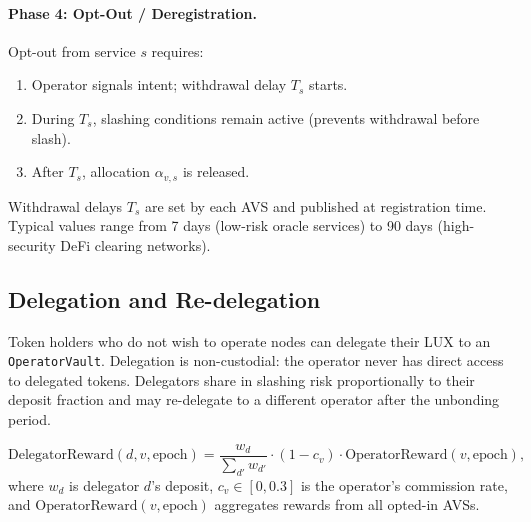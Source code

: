 \paragraph{Phase 4: Opt-Out / Deregistration.}
Opt-out from service $s$ requires:
\begin{enumerate}[leftmargin=1.5em]
  \item Operator signals intent; withdrawal delay $T_s$ starts.
  \item During $T_s$, slashing conditions remain active (prevents withdrawal before slash).
  \item After $T_s$, allocation $\alpha_{v,s}$ is released.
\end{enumerate}

Withdrawal delays $T_s$ are set by each AVS and published at registration time. Typical
values range from 7 days (low-risk oracle services) to 90 days (high-security DeFi
clearing networks).

\subsection{Delegation and Re-delegation}

Token holders who do not wish to operate nodes can delegate their LUX to an
\texttt{OperatorVault}. Delegation is non-custodial: the operator never has direct
access to delegated tokens. Delegators share in slashing risk proportionally to their
deposit fraction and may re-delegate to a different operator after the unbonding period.

\begin{equation}
  \text{DelegatorReward}(d, v, \text{epoch}) =
  \frac{w_d}{\sum_{d'} w_{d'}} \cdot (1 - c_v) \cdot \text{OperatorReward}(v, \text{epoch}),
\end{equation}
where $w_d$ is delegator $d$'s deposit, $c_v \in [0, 0.3]$ is the operator's commission
rate, and $\text{OperatorReward}(v, \text{epoch})$ aggregates rewards from all opted-in AVSs.

